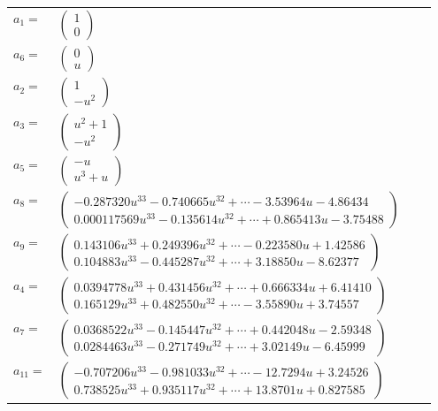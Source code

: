 \documentclass[1p]{elsarticle_modified}
\theoremstyle{definition}
\begin{document}
\begin{tabular}{m{7pt} m{180pt} m{7pt} m{180pt} }
\flushright $a_{1}=$&$\begin{pmatrix}1\\0\end{pmatrix}$ \\
\flushright $a_{6}=$&$\begin{pmatrix}0\\u\end{pmatrix}$ \\
\flushright $a_{2}=$&$\begin{pmatrix}1\\- u^2\end{pmatrix}$ \\
\flushright $a_{3}=$&$\begin{pmatrix}u^2+1\\- u^2\end{pmatrix}$ \\
\flushright $a_{5}=$&$\begin{pmatrix}- u\\u^3+u\end{pmatrix}$ \\
\flushright $a_{8}=$&$\begin{pmatrix}-0.287320 u^{33}-0.740665 u^{32}+\cdots-3.53964 u-4.86434\\0.000117569 u^{33}-0.135614 u^{32}+\cdots+0.865413 u-3.75488\end{pmatrix}$ \\
\flushright $a_{9}=$&$\begin{pmatrix}0.143106 u^{33}+0.249396 u^{32}+\cdots-0.223580 u+1.42586\\0.104883 u^{33}-0.445287 u^{32}+\cdots+3.18850 u-8.62377\end{pmatrix}$ \\
\flushright $a_{4}=$&$\begin{pmatrix}0.0394778 u^{33}+0.431456 u^{32}+\cdots+0.666334 u+6.41410\\0.165129 u^{33}+0.482550 u^{32}+\cdots-3.55890 u+3.74557\end{pmatrix}$ \\
\flushright $a_{7}=$&$\begin{pmatrix}0.0368522 u^{33}-0.145447 u^{32}+\cdots+0.442048 u-2.59348\\0.0284463 u^{33}-0.271749 u^{32}+\cdots+3.02149 u-6.45999\end{pmatrix}$ \\
\flushright $a_{11}=$&$\begin{pmatrix}-0.707206 u^{33}-0.981033 u^{32}+\cdots-12.7294 u+3.24526\\0.738525 u^{33}+0.935117 u^{32}+\cdots+13.8701 u+0.827585\end{pmatrix}$ \\

\end{tabular}
\end{document}

